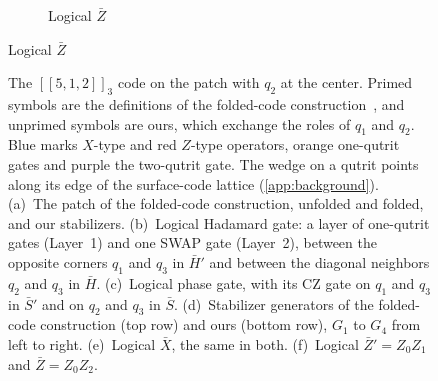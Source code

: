 \begin{figure}[H]
\begin{subfigure}[c]{0.6\textwidth}
\caption{Logical $\bar Z$}
\end{subfigure}
\end{figure}

\begin{figure}[H]\ContinuedFloat
\centering
\caption{The $[[5,1,2]]_3$ code on the patch with $q_2$ at the center. Primed symbols are the definitions of the folded-code construction~\cite{Moussa2016}, and unprimed symbols are ours, which exchange the roles of $q_1$ and $q_2$. Blue marks $X$-type and red $Z$-type operators, orange one-qutrit gates and purple the two-qutrit gate. The wedge on a qutrit points along its edge of the surface-code lattice (\autoref{app:background}).
(a)~The patch of the folded-code construction, unfolded and folded, and our stabilizers.
(b)~Logical Hadamard gate: a layer of one-qutrit gates (Layer~1) and one SWAP gate (Layer~2), between the opposite corners $q_1$ and $q_3$ in $\bar H'$ and between the diagonal neighbors $q_2$ and $q_3$ in $\bar H$.
(c)~Logical phase gate, with its CZ gate on $q_1$ and $q_3$ in $\bar S'$ and on $q_2$ and $q_3$ in $\bar S$.
(d)~Stabilizer generators of the folded-code construction (top row) and ours (bottom row), $G_1$ to $G_4$ from left to right.
(e)~Logical $\bar X$, the same in both.
(f)~Logical $\bar Z' = Z_0 Z_1$ and $\bar Z = Z_0 Z_2$.}
\label{fig: 5-qutrit-code}

\end{figure}
